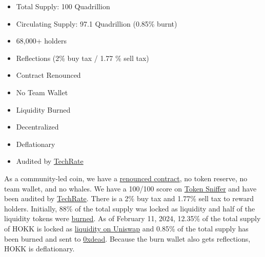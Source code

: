 \documentclass{article}
\begin{document}
\bigskip
\begin{tcolorbox}[enhanced,attach boxed title to top center={yshift=-3mm,yshifttext=-1mm},
  colback=salmon1!10!white,colframe=pink1,colbacktitle=pink1,
  title=Fast Facts,fonttitle=\bfseries,
  boxed title style={size=small,colframe=pink1} ]
  \begin{itemize}
  \item Total Supply: 100 Quadrillion
  \item Circulating Supply: 97.1 Quadrillion (0.85\% burnt)
  \item 68,000+ holders
  \item Reflections (2\% buy tax / 1.77 \% sell tax)
  \item Contract Renounced
  \item No Team Wallet
  \item Liquidity Burned
  \item Decentralized
  \item Deflationary
  \item Audited by \href{https://github.com/TechRate/Smart-Contract-Audits/blob/main/2018-21%20A-M/Hokkaidu%20Inu.pdf}{TechRate}
\end{itemize}
\end{tcolorbox}

As a community-led coin, we have a \href{https://etherscan.io/tx/0x06ca2f1e4203da09f8ac48351c726af638fa018b9078f24878fc5838ce9c01c4}{renounced contract}, no token reserve, no team wallet, and no whales. We have a 100/100 score on \href{https://tokensniffer.com/token/eth/b4sx59z86ppaszdabzp9xp1bafkdj9ljqhf2bi2mgvjc0q0o2n4a4es0kbsa}{Token Sniffer} and have been audited by \href{https://github.com/TechRate/Smart-Contract-Audits/blob/main/2018-21%20A-M/Hokkaidu%20Inu.pdf}{TechRate}. There is a 2\% buy tax and 1.77\% sell tax to reward holders. Initially, 88\% of the total supply was locked as liquidity and half of the liquidity tokens were \href{https://etherscan.io/tx/0x7e564274825e0e48cd4dcef21312d56a98471e9b84861c0180489bf54d693137}{burned}. As of February 11, 2024, 12.35\% of the total supply of HOKK is locked as \href{https://etherscan.io/address/0x9314941c11d6dee1d7bf93113eb74d4718949f3b}{liquidity on Uniswap} and 0.85\% of the total supply has been burned and sent to \href{https://etherscan.io/address/0x000000000000000000000000000000000000dead}{0xdead}. Because the burn wallet also gets reflections, HOKK is deflationary.

\newpage
\end{document}
